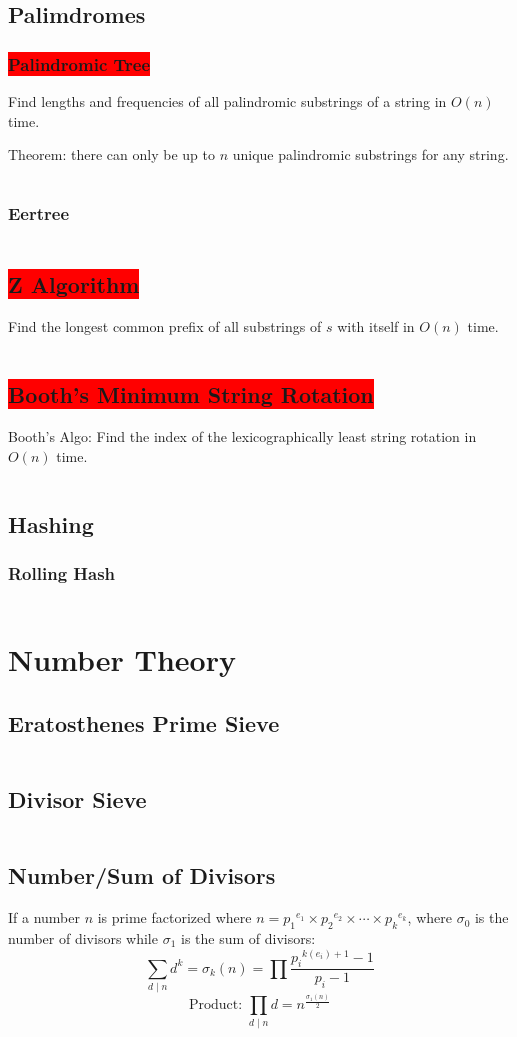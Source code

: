 \documentclass[8pt,a4paper,landscape,oneside]{amsart}
\newcommand{\code}[1]{\inputminted[fontsize=\normalsize,baselinestretch=1]{cpp}{_code/#1}}
\newcommand{\subsectionRed}[1]{\subsection{\colorbox{red}{\color{white}#1}}}
\newcommand{\subsubsectionRed}[1]{\subsubsection{\colorbox{red}{\color{white}#1}}}
\begin{document}
\begin{multicols*}{3}
  \subsection{Palimdromes}
    \subsubsectionRed{Palindromic Tree}
      Find lengths and frequencies of all palindromic substrings of a string in $O(n)$ time.

      Theorem: there can only be up to $n$ unique palindromic substrings for any string.
      \code{strings/palindromic-tree.cpp}
    \subsubsection{Eertree}
      \code{strings/eertree.cpp}
  \subsectionRed{Z Algorithm}
    Find the longest common prefix of all substrings of $s$ with itself in $O(n)$ time.
    \code{strings/z.cpp}
  \subsectionRed{Booth's Minimum String Rotation}
    Booth's Algo: Find the index of the lexicographically least string rotation in $O(n)$ time.
    \code{strings/booth.cpp}
	\subsection{Hashing}
    \subsubsection{Rolling Hash}
      \code{strings/rolling_hash.cpp}
\section{Number Theory}
	\subsection{Eratosthenes Prime Sieve}
    \code{numtheory/prime-sieve.cpp}
  \subsection{Divisor Sieve}
    \code{numtheory/divisor-sieve.cpp}
  \subsection{Number/Sum of Divisors}
    If a number $n$ is prime factorized where $n = {p_1}^{e_1} \times {p_2}^{e_2} \times \cdots \times {p_k}^{e_k}$, where $\sigma_0$ is the number of divisors while $\sigma_1$ is the sum of divisors:
    \[
    \sum_{d\mid n} d^k = \sigma_k (n) = \prod \frac{{p_i}^{k(e_i)+1}-1}{p_i -1}
    \]
    \[
    \text{Product: } \prod_{d\mid n} d = n^{\frac{\sigma_1 (n)}{2}}
    \]

\end{multicols*}
\end{document}
